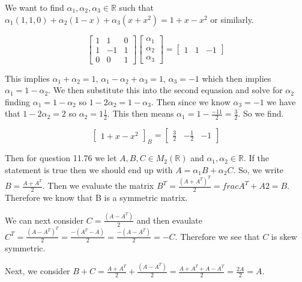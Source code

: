 \documentclass{article}
\begin{document}
We want to find $\alpha_1, \alpha_2, \alpha_3 \in \mathbb{R}$ such that $\alpha_1 (1,1,0) + \alpha_2(1-x) +\alpha_3 (x + x^2) = 1 + x - x^2$ or similarly.

\begin{equation}
    \begin{bmatrix}
        1 & 1 & 0 \\ 1& -1& 1 \\ 0 &0 &1
    \end{bmatrix}
    \begin{bmatrix}
        \alpha_1 \\ \alpha_2 \\ \alpha_3
    \end{bmatrix}
    =
    \begin{bmatrix}
        1 &1& -1
    \end{bmatrix}
\end{equation}

This implies $\alpha_1 + \alpha_2 = 1$, $\alpha_1 - \alpha_2 + \alpha_3 = 1$, $\alpha_3 = -1$ which then implies $\alpha_1 = 1- \alpha_2$. 
We then substitute this into the second equasion and solve for $\alpha_2$ finding $\alpha_1 = 1-\alpha_2$ so $1-2\alpha_2 = 1-\alpha_3$. 
Then since we know $\alpha_3 = -1$ we have that $1-2\alpha_2 = 2$ so $\alpha_2 = 1\frac{1}{2}$. This then means $\alpha_1 = 1- \frac{-11}{2} = \frac{3}{2}$. So we find.

\begin{equation}
    \begin{bmatrix}
        1 + x -x^2
    \end{bmatrix}_B
    =
    \begin{bmatrix}
        \frac{3}{2} & -\frac{1}{2} & -1
    \end{bmatrix}
\end{equation}

Then for question 11.76 we let $A,B,C \in M_2(\mathbb{R})$ and $\alpha_1, \alpha_2 \in \mathbb{R}$. If the statement is true then we should end up with $A = \alpha_1B +\alpha_2 C$. So, we write $B = \frac{A + A^T}{2}$. Then we evaluate the matrix $B^T = \frac{(A+A^T)^T}{2} = frac{ A^T + A}{2} = B$. Therefore we know that B is a symmetric matrix. 

We can next consider $C = \frac{(A-A^T)}{2}$ and then evaulate $C^T = \frac{(A-A^T)^T}{2} = \frac{-(A^T - A)}{2} = \frac{-(A-A^T)}{2} = -C$. Therefore we see that $C$ is skew symmetric. 

Next, we consider $B+C = \frac{A + A^T}{2} + \frac{(A-A^T)}{2} = \frac{A+A^T+A-A^T}{2} = \frac{2A}{2} = A$.
\end{document}
